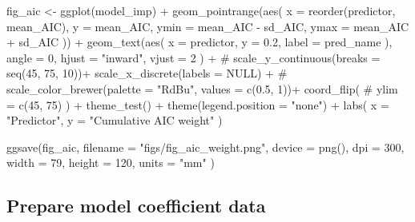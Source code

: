 \documentclass[]{article}
\newenvironment{Shaded}{}{}
\newcommand{\CommentTok}[1]{\textcolor[rgb]{0.00,0.50,0.00}{#1}}
\newcommand{\DataTypeTok}[1]{#1}
\newcommand{\DecValTok}[1]{#1}
\newcommand{\FloatTok}[1]{#1}
\newcommand{\KeywordTok}[1]{\textcolor[rgb]{0.00,0.00,1.00}{#1}}
\newcommand{\NormalTok}[1]{#1}
\newcommand{\OperatorTok}[1]{#1}
\newcommand{\OtherTok}[1]{\textcolor[rgb]{1.00,0.25,0.00}{#1}}
\newcommand{\StringTok}[1]{\textcolor[rgb]{0.00,0.50,0.50}{#1}}
\begin{document}
\begin{Shaded}
\begin{Highlighting}[numbers=left,,]
\NormalTok{fig_aic <-}
\StringTok{  }\KeywordTok{ggplot}\NormalTok{(model_imp) }\OperatorTok{+}
\StringTok{  }\KeywordTok{geom_pointrange}\NormalTok{(}\KeywordTok{aes}\NormalTok{(}
    \DataTypeTok{x =} \KeywordTok{reorder}\NormalTok{(predictor, mean_AIC),}
    \DataTypeTok{y =}\NormalTok{ mean_AIC,}
    \DataTypeTok{ymin =}\NormalTok{ mean_AIC }\OperatorTok{-}\StringTok{ }\NormalTok{sd_AIC,}
    \DataTypeTok{ymax =}\NormalTok{ mean_AIC }\OperatorTok{+}\StringTok{ }\NormalTok{sd_AIC}
\NormalTok{  )) }\OperatorTok{+}
\StringTok{  }\KeywordTok{geom_text}\NormalTok{(}\KeywordTok{aes}\NormalTok{(}
    \DataTypeTok{x =}\NormalTok{ predictor,}
    \DataTypeTok{y =} \FloatTok{0.2}\NormalTok{,}
    \DataTypeTok{label =}\NormalTok{ pred_name}
\NormalTok{  ),}
  \DataTypeTok{angle =} \DecValTok{0}\NormalTok{,}
  \DataTypeTok{hjust =} \StringTok{"inward"}\NormalTok{,}
  \DataTypeTok{vjust =} \DecValTok{2}
\NormalTok{  ) }\OperatorTok{+}
\StringTok{  }\CommentTok{# scale_y_continuous(breaks = seq(45, 75, 10))+}
\StringTok{  }\KeywordTok{scale_x_discrete}\NormalTok{(}\DataTypeTok{labels =} \OtherTok{NULL}\NormalTok{) }\OperatorTok{+}
\StringTok{  }\CommentTok{# scale_color_brewer(palette = "RdBu", values = c(0.5, 1))+}
\StringTok{  }\KeywordTok{coord_flip}\NormalTok{(}
    \CommentTok{# ylim = c(45, 75)}
\NormalTok{  ) }\OperatorTok{+}
\StringTok{  }\KeywordTok{theme_test}\NormalTok{() }\OperatorTok{+}
\StringTok{  }\KeywordTok{theme}\NormalTok{(}\DataTypeTok{legend.position =} \StringTok{"none"}\NormalTok{) }\OperatorTok{+}
\StringTok{  }\KeywordTok{labs}\NormalTok{(}
    \DataTypeTok{x =} \StringTok{"Predictor"}\NormalTok{,}
    \DataTypeTok{y =} \StringTok{"Cumulative AIC weight"}
\NormalTok{  )}

\KeywordTok{ggsave}\NormalTok{(fig_aic,}
  \DataTypeTok{filename =} \StringTok{"figs/fig_aic_weight.png"}\NormalTok{,}
  \DataTypeTok{device =} \KeywordTok{png}\NormalTok{(),}
  \DataTypeTok{dpi =} \DecValTok{300}\NormalTok{,}
  \DataTypeTok{width =} \DecValTok{79}\NormalTok{, }\DataTypeTok{height =} \DecValTok{120}\NormalTok{, }\DataTypeTok{units =} \StringTok{"mm"}
\NormalTok{)}
\end{Highlighting}
\end{Shaded}

\hypertarget{prepare-model-coefficient-data}{%
\subsection{Prepare model coefficient data}\label{prepare-model-coefficient-data}}
\end{document}
